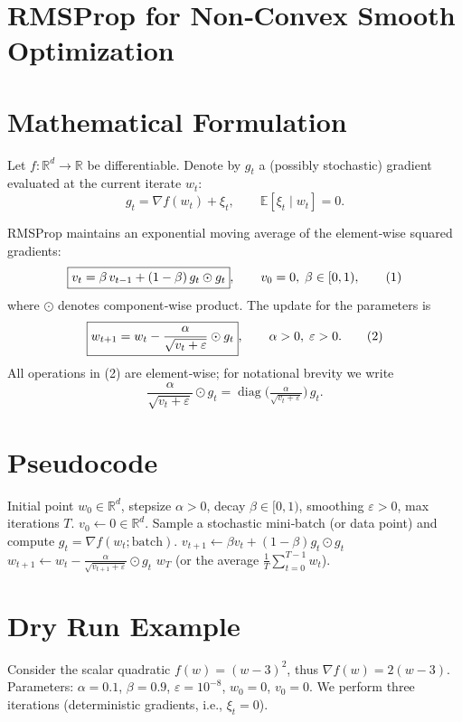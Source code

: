 \documentclass{article}
\newcommand{\EE}{\mathbb{E}}
\newcommand{\RR}{\mathbb{R}}
\begin{document}
\section*{RMSProp for Non‑Convex Smooth Optimization}

\section*{Mathematical Formulation}
Let $f:\RR^{d}\rightarrow\RR$ be differentiable.  
Denote by $g_{t}$ a (possibly stochastic) gradient evaluated at the current iterate $w_{t}$:
\[
g_{t}= \nabla f(w_{t})+\xi_{t},\qquad \EE[\xi_{t}\mid w_{t}]=0 .
\]

RMSProp maintains an exponential moving average of the element‑wise squared gradients:
\[
\boxed{%
v_{t}= \beta\,v_{t-1} + (1-\beta)\,g_{t}\odot g_{t}},\qquad v_{0}=0,\;\beta\in[0,1),
\tag{1}
\]
where $\odot$ denotes component‑wise product.  
The update for the parameters is
\[
\boxed{%
w_{t+1}= w_{t} - \frac{\alpha}{\sqrt{v_{t}+\varepsilon}}\odot g_{t}},\qquad
\alpha>0,\;\varepsilon>0.
\tag{2}
\]
All operations in (2) are element‑wise; for notational brevity we write
\[
\frac{\alpha}{\sqrt{v_{t}+\varepsilon}}\odot g_{t}= \operatorname{diag}\!\bigl(\tfrac{\alpha}{\sqrt{v_{t}+\varepsilon}}\bigr)\,g_{t}.
\]

\section*{Pseudocode}
\begin{algorithm}[H]
\caption{RMSProp (non‑convex setting)}
\begin{algorithmic}[1]
\Require Initial point $w_{0}\in\RR^{d}$, stepsize $\alpha>0$, decay $\beta\in[0,1)$, 
        smoothing $\varepsilon>0$, max iterations $T$.
\State $v_{0}\gets 0\in\RR^{d}$.
    \State Sample a stochastic mini‑batch (or data point) and compute $g_{t}= \nabla f(w_{t};\text{batch})$.
    \State $v_{t+1}\gets \beta v_{t} + (1-\beta) g_{t}\odot g_{t}$ \hfill{}
    \State $w_{t+1}\gets w_{t} - \frac{\alpha}{\sqrt{v_{t+1}+\varepsilon}}\odot g_{t}$ \hfill{}
\EndFor
\State \Return $w_{T}$ (or the average $\frac{1}{T}\sum_{t=0}^{T-1}w_{t}$).
\end{algorithmic}
\end{algorithm}

\section*{Dry Run Example}
Consider the scalar quadratic $f(w)=(w-3)^{2}$, thus $\nabla f(w)=2(w-3)$.  
Parameters: $\alpha=0.1$, $\beta=0.9$, $\varepsilon=10^{-8}$, $w_{0}=0$, $v_{0}=0$.
We perform three iterations (deterministic gradients, i.e., $\xi_{t}=0$).
\end{document}
